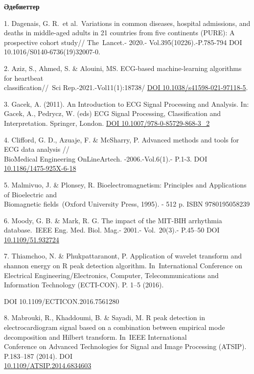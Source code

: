 \begin{center}
{\bfseries Әдебиеттер}
\end{center}

\begin{references}
1. Dagenais, G. R.~et al.~Variations in common diseases, hospital
admissions, and deaths in middle-aged adults in 21 countries from five
continents (PURE): A prospective cohort study// The~Lancet.- 2020.-
Vol.395(10226).-P.785-794 DOI 10.1016/S0140-6736(19)32007-0.

2. Aziz, S., Ahmed, S. \& Alouini, MS. ECG-based machine-learning
algorithms for heartbeat \\classification//~Sci Rep.-2021.-Vol11(1):18738/
\href{https://doi.org/10.1038/s41598-021-97118-5}{DOI
10.1038/s41598-021-97118-5}.

3. Gacek, A. (2011). An Introduction to ECG Signal Processing and
Analysis. In: Gacek, A., Pedrycz, W. (eds) ECG Signal Processing,
Classification and Interpretation. Springer, London.
\href{https://doi.org/10.1007/978-0-85729-868-3_2}{DOI
10.1007/978-0-85729-868-3\_2}

4. Clifford, G. D., Azuaje, F. \& McSharry, P. Advanced methods and
tools for ECG data analysis
//\href{https://www.researchgate.net/journal/BioMedical-Engineering-OnLine-1475-925X?_tp=eyJjb250ZXh0Ijp7ImZpcnN0UGFnZSI6InB1YmxpY2F0aW9uIiwicGFnZSI6InB1YmxpY2F0aW9uIn19}\\{BioMedical
Engineering OnLine}Artech. -2006.-Vol.6(1).- P.1-3. DOI
\href{http://dx.doi.org/10.1186/1475-925X-6-18}{10.1186/1475-925X-6-18}

5. Malmivuo, J. \& Plonsey, R. Bioelectromagnetism: Principles and
Applications of Bioelectric and \\Biomagnetic fields~(Oxford University
Press, 1995). - 512 p. ISBN 9780195058239

6. Moody, G. B. \& Mark, R. G. The impact of the MIT-BIH arrhythmia
database.~IEEE Eng. Med. Biol. Mag.- 2001.- Vol.~20(3).- P.45--50 DOI
\href{https://doi.org/10.1109/51.932724}{10.1109/51.932724}

7. Thiamchoo, N. \& Phukpattaranont, P. Application of wavelet transform
and shannon energy on R peak detection algorithm. In~International
Conference on Electrical Engineering/Electronics, Computer,
Telecommunications and Information Technology (ECTI-CON). P. 1--5
(2016).

DOI 10.1109/ECTICON.2016.7561280

8. Mabrouki, R., Khaddoumi, B. \& Sayadi, M. R peak detection in
electrocardiogram signal based on a combination between empirical mode
decomposition and Hilbert transform. In~IEEE International \\Conference on
Advanced Technologies for Signal and Image Processing (ATSIP).
P.183--187 (2014). DOI\\
\href{http://dx.doi.org/10.1109\%2FATSIP.2014.6834603}{10.1109/ATSIP.2014.6834603}


\end{references}
